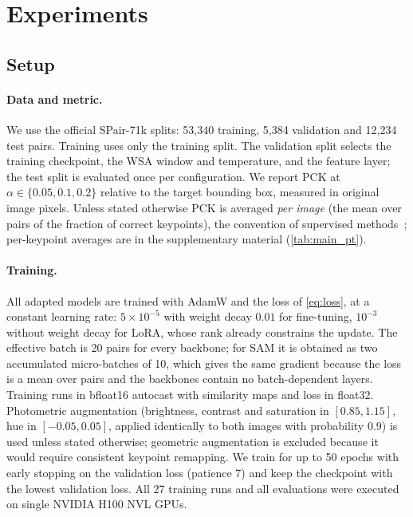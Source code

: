 \section{Experiments}
\label{sec:experiments}

\subsection{Setup}
\label{sec:setup}

\paragraph{Data and metric.}
We use the official SPair-71k splits: 53{,}340 training, 5{,}384 validation and 12{,}234 test pairs. Training uses only the training split. The validation split selects the training checkpoint, the WSA window and temperature, and the feature layer; the test split is evaluated once per configuration. We report PCK at $\alpha\in\{0.05,0.1,0.2\}$ relative to the target bounding box, measured in original image pixels. Unless stated otherwise PCK is averaged \emph{per image} (the mean over pairs of the fraction of correct keypoints), the convention of supervised methods~\cite{zhang2024telling}; per-keypoint averages are in the supplementary material (\cref{tab:main_pt}).

\paragraph{Training.}
All adapted models are trained with AdamW and the loss of \cref{eq:loss}, at a constant learning rate: $5\times10^{-5}$ with weight decay $0.01$ for fine-tuning, $10^{-3}$ without weight decay for LoRA, whose rank already constrains the update. The effective batch is 20 pairs for every backbone; for SAM it is obtained as two accumulated micro-batches of 10, which gives the same gradient because the loss is a mean over pairs and the backbones contain no batch-dependent layers. Training runs in bfloat16 autocast with similarity maps and loss in float32. Photometric augmentation (brightness, contrast and saturation in $[0.85,1.15]$, hue in $[-0.05,0.05]$, applied identically to both images with probability $0.9$) is used unless stated otherwise; geometric augmentation is excluded because it would require consistent keypoint remapping. We train for up to 50 epochs with early stopping on the validation loss (patience 7) and keep the checkpoint with the lowest validation loss. All 27 training runs and all evaluations were executed on single NVIDIA H100 NVL GPUs.

